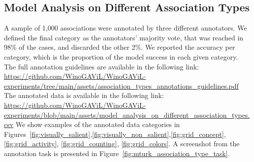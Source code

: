 \documentclass{article}
\begin{document}
\subsection{Model Analysis on Different Association Types}
\label{sec:visually_salient-analysis}
A sample of 1,000 associations were annotated by three different annotators. We defined the final category as the annotators' majority vote, that was reached in 98\% of the cases, and discarded the other 2\%. We reported the accuracy per category, which is the proportion of the model success in each given category. 
The full annotation guidelines are available in the following link: \url{https://github.com/WinoGAViL/WinoGAViL-experiments/tree/main/assets/association_types_annotations_guidelines.pdf}
The annotated data is available in the following link: \url{https://github.com/WinoGAViL/WinoGAViL-experiments/blob/main/assets/model_analysis_on_different_association_types.csv}
We show examples of the annotated data categories in Figures~\ref{fig:visually_salient},\ref{fig:visually_non_salient},\ref{fig:grid_concept},\ref{fig:grid_activity}, \ref{fig:grid_counting}, \ref{fig:grid_colors}. A screenshot from the annotation task is presented in Figure~\ref{fig:mturk_association_type_task}.
\end{document}
